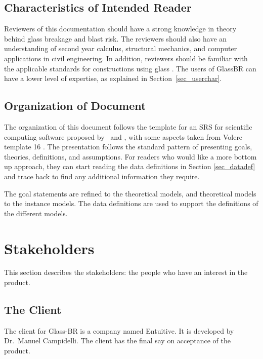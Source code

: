 \documentclass[12pt]{article}
\newcommand{\progname}{Glass-BR}
\begin{document}
\subsection{Characteristics of Intended Reader}
\label{Sec:CharofInteRead}
Reviewers of this documentation should have a strong knowledge in theory behind
glass breakage and blast risk. The reviewers should also have an understanding
of second year calculus, structural mechanics, and computer applications in
civil engineering. In addition, reviewers should be familiar with the applicable
standards for constructions using glass \cite{ASTM2009, ASTM2016,
  ASTM2012a}. The users of GlassBR can have a lower level of expertise, as
explained in Section~\ref{sec_userchar}.

\subsection{Organization of Document}

The organization of this document follows the template for an SRS for scientific
computing software proposed by~\cite{Koothoor2013} and \cite{SmithAndLai2005},
with some aspects taken from Volere template 16
\cite{RobertsonAndRobertson1999Vol}. The presentation follows the standard
pattern of presenting goals, theories, definitions, and assumptions.  For
readers who would like a more bottom up approach, they can start reading the
data definitions in Section \ref{sec_datadef} and trace back to find any
additional information they require.

The goal statements are refined to the theoretical models, and theoretical
models to the instance models. The data definitions are used to support the
definitions of the different models.

\section{Stakeholders}

This section describes the stakeholders: the people who have an interest in the
product.

\subsection{The Client}

The client for \progname{} is a company named Entuitive. It is developed by
Dr.\ Manuel Campidelli. The client has the final say on acceptance of the product.
\end{document}
